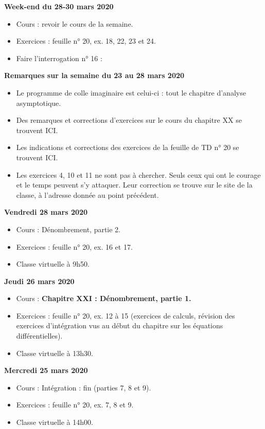 \documentclass[12pt,a4paper]{article}
\begin{document}
\noindent\textbf{Week-end du 28-30 mars 2020}
\begin{itemize}
\item Cours : revoir le cours de la semaine.
\item Exercices : feuille n° 20, ex. 18, 22, 23 et 24.
\item Faire l'\og interrogation \fg n° 16 : 
\vspace{.4cm}
\end{itemize}

\noindent\textbf{\bf Remarques sur la semaine du 23 au 28 mars 2020}
\begin{itemize}
\item Le programme de colle imaginaire est celui-ci : tout le chapitre d'analyse asymptotique.
\item Des remarques et corrections d'exercices sur le cours du chapitre XX se trouvent ICI.
\item Les indications et corrections des exercices de la feuille de TD n° 20 se trouvent ICI.
\item Les exercices 4, 10 et 11 ne sont pas à chercher. Seuls ceux qui ont le courage et le temps peuvent s'y attaquer. Leur correction se trouve sur le site de la classe, à l'adresse donnée au point précédent.\vspace{.4cm}
\end{itemize}

\noindent\textbf{\bf Vendredi 28 mars 2020}
\begin{itemize}
\item Cours : Dénombrement, partie 2.
\item Exercices : feuille n° 20, ex. 16 et 17.
\item Classe virtuelle à 9h50.\vspace{.4cm}
\end{itemize}

\noindent\textbf{Jeudi 26 mars 2020}
\begin{itemize}
\item Cours : \bf Chapitre XXI \rm : Dénombrement, partie 1.
\item Exercices : feuille n° 20, ex. 12 à 15 (exercices de calculs, révision des exercices d'intégration vus au début du chapitre sur les équations différentielles).
\item Classe virtuelle à 13h30.\vspace{.4cm}
\end{itemize}

\noindent\textbf{Mercredi 25 mars 2020}
\begin{itemize}
\item Cours : Intégration : fin (parties 7, 8 et 9).
\item Exercices : feuille n° 20, ex. 7, 8 et 9.
\item Classe virtuelle à 14h00.\vspace{.4cm}
\end{itemize}
\end{document}
